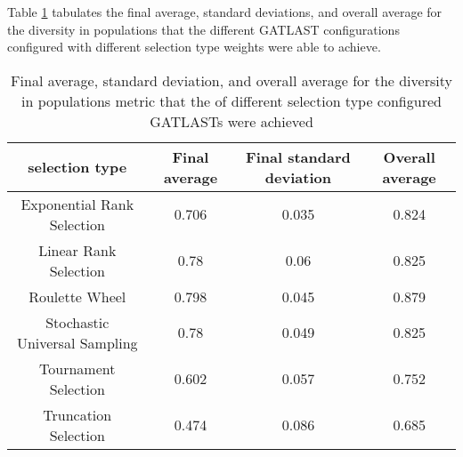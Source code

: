 Table \ref{tab:HP:GA:selectionMethod:diversity in populations} tabulates the final average, standard deviations, and overall average for the diversity in populations that the different GATLAST configurations configured with different selection type weights were able to achieve.
\begin{table}[tbh!]
\centering
\begin{adjustbox}{trim=0cm 0cm 0cm 0cm, clip=true}
\begin{tabular}{|c|c|c|c|}
\hline
selection type & Final average & Final standard deviation & Overall average\\
\hline
Exponential Rank Selection & 0.706 & 0.035 & 0.824\\\hline
Linear Rank Selection & 0.78 & 0.06 & 0.825\\\hline
Roulette Wheel & 0.798 & 0.045 & 0.879\\\hline
Stochastic Universal Sampling & 0.78 & 0.049 & 0.825\\\hline
Tournament Selection & 0.602 & 0.057 & 0.752\\\hline
Truncation Selection & 0.474 & 0.086 & 0.685\\\hline
\end{tabular}
\end{adjustbox}
\caption{Final average, standard deviation, and overall average for the diversity in populations metric that the of different selection type configured GATLASTs were achieved}
\label{tab:HP:GA:selectionMethod:diversity in populations}
\end{table}